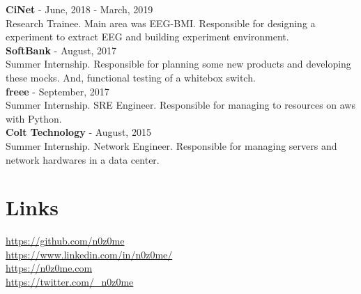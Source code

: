 \documentclass[11pt]{article} %
\begin{document}
\begin{paracol}{2}
\textbf{\color{subtitle}CiNet} \hspace{0.5mm} {\color{subtitle} - June, 2018 - March, 2019}\\
Research Trainee. Main area was EEG-BMI. Responsible for designing a experiment to extract EEG
 and building experiment environment.\\

\textbf{\color{subtitle}SoftBank} \hspace{0.5mm} {\color{subtitle} - August, 2017}\\
Summer Internship. Responsible for planning some new products and developing these mocks. 
And, functional testing of a whitebox switch.\\

\textbf{\color{subtitle}freee} \hspace{0.5mm} {\color{subtitle} - September, 2017}\\
Summer Internship. SRE Engineer. Responsible for managing to resources on aws with Python.\\

\textbf{\color{subtitle}Colt Technology} \hspace{0.5mm} {\color{subtitle} - August, 2015}\\
Summer Internship. Network Engineer. Responsible for managing servers and network hardwares in a data center.\\


\vspace{0.3cm}


\section{Links}
{\faGithub} \hspace{1mm} \href{https://github.com/n0z0me}{https://github.com/n0z0me}\\ %
{\faLinkedinSquare} \hspace{1mm} \href{https://www.linkedin.com/in/n0z0me/}{https://www.linkedin.com/in/n0z0me/}\\ %
{\small\faDesktop} \hspace{0.8mm} \href{https://n0z0me.com}{https://n0z0me.com}\\ %
{\faTwitterSquare} \hspace{1mm} \href{https://twitter.com/\_n0z0me}{https://twitter.com/\_n0z0me}\\

\end{paracol}

\end{document}
